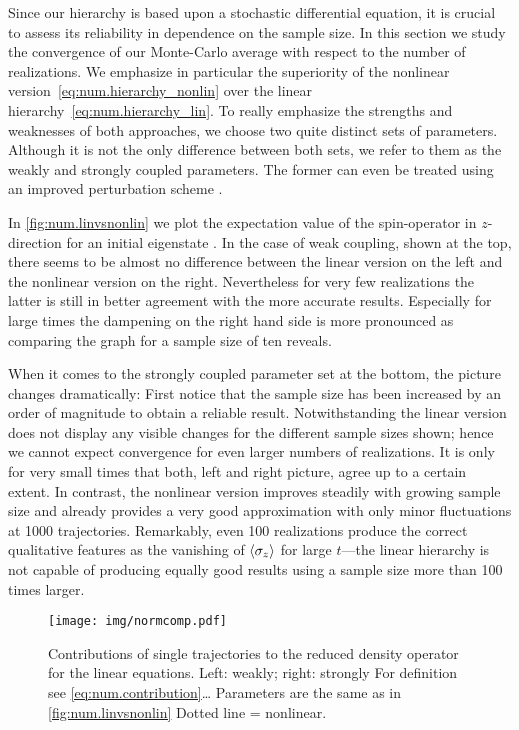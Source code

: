 Since our hierarchy is based upon a stochastic differential equation, it is crucial to assess its reliability in dependence on the sample size.
In this section we study the convergence of our Monte-Carlo average with respect to the number of realizations.
We emphasize in particular the superiority of the nonlinear version~\ref{eq:num.hierarchy_nonlin} over the linear hierarchy~\ref{eq:num.hierarchy_lin}.
To really emphasize the strengths and weaknesses of both approaches, we choose two quite distinct sets of parameters.
Although it is not the only difference between both sets, we refer to them as the weakly and strongly coupled parameters.
The former can even be treated using an improved perturbation scheme \cite{GaHuZh10_qubit,HuZh08_qubit}.

In \autoref{fig:num.linvsnonlin} we plot the expectation value of the spin-operator in $z$-direction for an initial eigenstate .
In the case of weak coupling, shown at the top, there seems to be almost no difference between the linear version on the left and the nonlinear version on the right.
Nevertheless for very few realizations the latter is still in better agreement with the more accurate results.
Especially for large times the dampening on the right hand side is more pronounced as comparing the graph for a sample size of ten reveals.

When it comes to the strongly coupled parameter set at the bottom, the picture changes dramatically:
First notice that the sample size has been increased by an order of magnitude to obtain a reliable result.
Notwithstanding the linear version does not display any visible changes for the different sample sizes shown; hence we cannot expect convergence for even larger numbers of realizations.
It is only for very small times that both, left and right picture, agree up to a certain extent.
In contrast, the nonlinear version improves steadily with growing sample size and already provides a very good approximation with only minor fluctuations at 1000 trajectories.
Remarkably, even 100 realizations produce the correct qualitative features as the vanishing of $\langle \sigma_z \rangle$ for large $t$---the linear hierarchy is not capable of producing equally good results using a sample size more than 100 times larger.\\

\begin{figure}[t]
  \centering
  \texttt{[image: img/normcomp.pdf]}
  \caption{%
    Contributions of single trajectories to the reduced density operator for the linear equations.
    Left: weakly; right: strongly
    For definition see \autoref{eq:num.contribution}\dots
    Parameters are the same as in \autoref{fig:num.linvsnonlin}
    Dotted line = nonlinear.
  }
  \label{fig:num.normcomp}
\end{figure}

